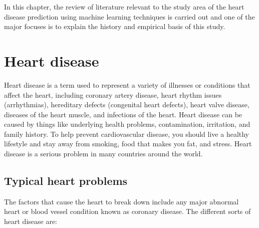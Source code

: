 \noindent
In this chapter, the review of literature relevant to the study area of the heart disease prediction using machine learning techniques is carried out and one of the major focuses is to explain the history and empirical basis of this study.

\section{Heart disease}
Heart disease is a term used to represent a variety of illnesses or conditions that affect the heart, including coronary artery disease, heart rhythm issues (arrhythmias), hereditary defects (congenital heart defects), heart valve disease, diseases of the heart muscle, and infections of the heart. Heart disease can be caused by things like underlying health problems, contamination, irritation, and family history. To help prevent cardiovascular disease, you should live a healthy lifestyle and stay away from smoking, food that makes you fat, and stress. Heart disease is a serious problem in many countries around the world.

\subsection{Typical heart problems}

The factors that cause the heart to break down include any major abnormal heart or blood vessel condition known as coronary disease. The different sorts of heart disease are:

